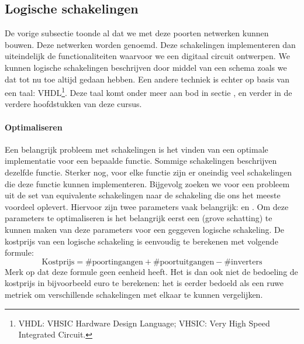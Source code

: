 \subsection{Logische schakelingen}
De vorige subsectie toonde al dat we met deze poorten netwerken kunnen bouwen. Deze netwerken worden  genoemd. Deze schakelingen implementeren dan uiteindelijk de functionaliteiten waarvoor we een digitaal circuit ontwerpen. We kunnen logische schakelingen beschrijven door middel van een schema zoals we dat tot nu toe altijd gedaan hebben. Een andere techniek is echter op basis van een taal: VHDL\footnote{VHDL: VHSIC Hardware Design Language; VHSIC: Very High Speed Integrated Circuit.}. Deze taal komt onder meer aan bod in sectie , en verder in de verdere hoofdstukken van deze cursus.

\paragraph{Optimaliseren}
Een belangrijk probleem met schakelingen is het vinden van een optimale implementatie voor een bepaalde functie. Sommige schakelingen beschrijven dezelfde functie. Sterker nog, voor elke functie zijn er oneindig veel schakelingen die deze functie kunnen implementeren. Bijgevolg zoeken we voor een probleem uit de set van equivalente schakelingen naar de schakeling die ons het meeste voordeel oplevert. Hiervoor zijn twee parameters vaak belangrijk:  en . Om deze parameters te optimaliseren is het belangrijk eerst een (grove schatting) te kunnen maken van deze parameters voor een geggeven logische schakeling. De kostprijs van een logische schakeling is eenvoudig te berekenen met volgende formule:
\begin{equation}
\mbox{Kostprijs}=\mbox{\#poortingangen}+\mbox{\#poortuitgangen}-\mbox{\#inverters}
\label{eqn:kosten}
\end{equation}
Merk op dat deze formule geen eenheid heeft. Het is dan ook niet de bedoeling de kostprijs in bijvoorbeeld euro te berekenen: het is eerder bedoeld als een ruwe metriek om verschillende schakelingen met elkaar te kunnen vergelijken.

